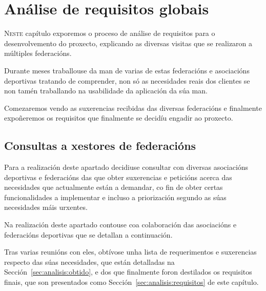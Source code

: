 \chapter{Análise de requisitos globais}
\minitoc


  \lettrine{N}{este} capítulo exporemos o proceso de análise de requisitos 
para o desenvolvemento do proxecto, explicando as diversas visitas que se 
realizaron a múltiples federacións.

  Durante meses traballouse da man de varias de estas federacións e asociacións 
deportivas tratando de comprender, non só as necesidades reais dos clientes se 
non tamén traballando na usabilidade da aplicación da súa man.

  Comezaremos vendo as suxerencias recibidas das diversas federacións e 
finalmente expoñeremos os requisitos que finalmente se decidíu engadir ao 
proxecto.

  \section{Consultas a xestores de federacións}
  Para a realización deste apartado decidiuse consultar con diversas 
asociacións deportivas e federacións das que obter suxerencias e peticións 
acerca das necesidades que actualmente están a demandar, co fin de obter certas 
funcionalidades a implementar e incluso a priorización segundo as súas
necesidades máis urxentes.

Na realización deste apartado contouse coa colaboración das asociacións e 
federacións deportivas que se detallan a continuación.

  Tras varias reunións con eles, obtívose unha lista de requerimentos e 
suxerencias respecto das súas necesidades, que están detalladas 
na Sección~\ref{sec:analisis:obtido}, e dos que finalmente foron destilados os 
requisitos finais, que son presentados como 
Sección~\ref{sec:analisis:requisitos} de este capítulo.

